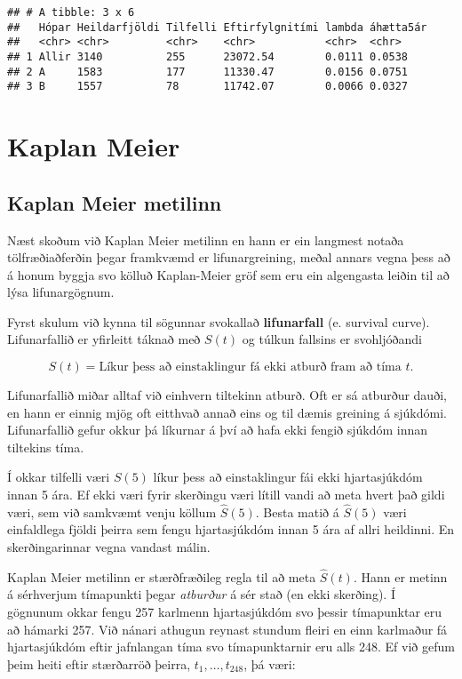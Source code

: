 \documentclass[
]{book}
\begin{document}
\begin{verbatim}
## # A tibble: 3 x 6
##   Hópar Heildarfjöldi Tilfelli Eftirfylgnitími lambda áhætta5ár
##   <chr> <chr>         <chr>    <chr>           <chr>  <chr>    
## 1 Allir 3140          255      23072.54        0.0111 0.0538   
## 2 A     1583          177      11330.47        0.0156 0.0751   
## 3 B     1557          78       11742.07        0.0066 0.0327
\end{verbatim}

\hypertarget{KM}{%
\section{Kaplan Meier}\label{KM}}

\hypertarget{kaplan-meier-metilinn}{%
\subsection{Kaplan Meier metilinn}\label{kaplan-meier-metilinn}}

Næst skoðum við Kaplan Meier metilinn en hann er ein langmest notaða tölfræðiaðferðin þegar framkvæmd er lifunargreining, meðal annars vegna þess að á honum byggja svo kölluð Kaplan-Meier gröf sem eru ein algengasta leiðin til að lýsa lifunargögnum.

Fyrst skulum við kynna til sögunnar svokallað \textbf{lifunarfall} (e. survival curve). Lifunarfallið er yfirleitt táknað með \(S(t)\) og túlkun fallsins er svohljóðandi

\[ 
S(t) = \text{Líkur þess að einstaklingur fá ekki atburð fram að tíma $t$.}
\]

Lifunarfallið miðar alltaf við einhvern tiltekinn atburð. Oft er sá atburður dauði, en hann er einnig mjög oft eitthvað annað eins og til dæmis greining á sjúkdómi. Lifunarfallið gefur okkur þá líkurnar á því að hafa ekki fengið sjúkdóm innan tiltekins tíma.

Í okkar tilfelli væri \(S(5)\) líkur þess að einstaklingur fái ekki hjartasjúkdóm innan 5 ára. Ef ekki væri fyrir skerðingu væri lítill vandi að meta hvert það gildi væri, sem við samkvæmt venju köllum \(\hat S(5)\). Besta matið á \(\hat S(5)\) væri einfaldlega fjöldi þeirra sem fengu hjartasjúkdóm innan 5 ára af allri heildinni. En skerðingarinnar vegna vandast málin.

Kaplan Meier metilinn er stærðfræðileg regla til að meta \(\hat S(t)\). Hann er metinn á sérhverjum tímapunkti þegar \emph{atburður} á sér stað (en ekki skerðing). Í gögnunum okkar fengu 257 karlmenn hjartasjúkdóm svo þessir tímapunktar eru að hámarki 257. Við nánari athugun reynast stundum fleiri en einn karlmaður fá hjartasjúkdóm eftir jafnlangan tíma svo tímapunktarnir eru alls 248. Ef við gefum þeim heiti eftir stærðarröð þeirra, \(t_1, \ldots , t_{248}\), þá væri:
\end{document}

